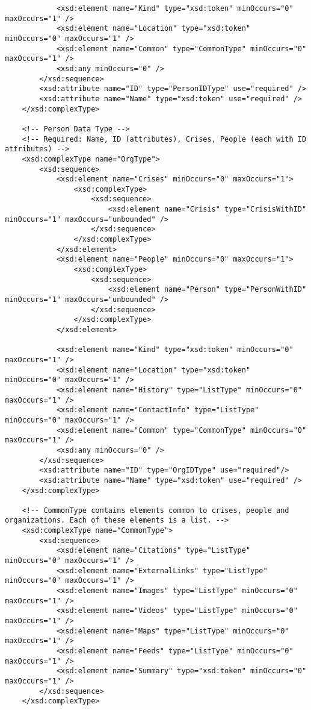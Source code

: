 \documentclass{article}
\begin{document}
\begin{lstlisting}
            <xsd:element name="Kind" type="xsd:token" minOccurs="0" maxOccurs="1" />
            <xsd:element name="Location" type="xsd:token" minOccurs="0" maxOccurs="1" />
            <xsd:element name="Common" type="CommonType" minOccurs="0" maxOccurs="1" />
            <xsd:any minOccurs="0" />
        </xsd:sequence>
        <xsd:attribute name="ID" type="PersonIDType" use="required" />
        <xsd:attribute name="Name" type="xsd:token" use="required" />
    </xsd:complexType>
    
    <!-- Person Data Type -->
    <!-- Required: Name, ID (attributes), Crises, People (each with ID attributes) -->
    <xsd:complexType name="OrgType">
        <xsd:sequence>
            <xsd:element name="Crises" minOccurs="0" maxOccurs="1">
                <xsd:complexType>
                    <xsd:sequence>
                        <xsd:element name="Crisis" type="CrisisWithID" minOccurs="1" maxOccurs="unbounded" />
                    </xsd:sequence>
                </xsd:complexType>
            </xsd:element>
            <xsd:element name="People" minOccurs="0" maxOccurs="1">
                <xsd:complexType>
                    <xsd:sequence>
                        <xsd:element name="Person" type="PersonWithID" minOccurs="1" maxOccurs="unbounded" />
                    </xsd:sequence>
                </xsd:complexType>
            </xsd:element>
            
            <xsd:element name="Kind" type="xsd:token" minOccurs="0" maxOccurs="1" />
            <xsd:element name="Location" type="xsd:token" minOccurs="0" maxOccurs="1" />
            <xsd:element name="History" type="ListType" minOccurs="0" maxOccurs="1" />
            <xsd:element name="ContactInfo" type="ListType" minOccurs="0" maxOccurs="1" />
            <xsd:element name="Common" type="CommonType" minOccurs="0" maxOccurs="1" />
            <xsd:any minOccurs="0" />
        </xsd:sequence>
        <xsd:attribute name="ID" type="OrgIDType" use="required"/>
        <xsd:attribute name="Name" type="xsd:token" use="required" />
    </xsd:complexType>
    
    <!-- CommonType contains elements common to crises, people and organizations. Each of these elements is a list. -->
    <xsd:complexType name="CommonType">
        <xsd:sequence>
            <xsd:element name="Citations" type="ListType" minOccurs="0" maxOccurs="1" />
            <xsd:element name="ExternalLinks" type="ListType" minOccurs="0" maxOccurs="1" />
            <xsd:element name="Images" type="ListType" minOccurs="0" maxOccurs="1" />
            <xsd:element name="Videos" type="ListType" minOccurs="0" maxOccurs="1" />
            <xsd:element name="Maps" type="ListType" minOccurs="0" maxOccurs="1" />
            <xsd:element name="Feeds" type="ListType" minOccurs="0" maxOccurs="1" />
            <xsd:element name="Summary" type="xsd:token" minOccurs="0" maxOccurs="1" />
        </xsd:sequence>
    </xsd:complexType>
    

\end{lstlisting}
\end{document}
